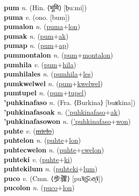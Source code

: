 \textbf{pum} \textit{n.} (Hin. ⟨भूमि⟩ [b̤uːmi])
 \label{pum} \\
\textbf{puma} \textit{v.} (ono. [bum])
 \label{puma} \\
\textbf{pumalon} \textit{n.} (\hyperref[puma]{puma}+\hyperref[lon]{lon})
 \label{pumalon} \\
\textbf{pumak} \textit{n.} (\hyperref[pum]{pum}+\hyperref[ak]{ak})
 \label{pumak} \\
\textbf{pumap} \textit{n.} (\hyperref[pum]{pum}+\hyperref[ap]{ap})
 \label{pumap} \\
\textbf{pummontalon} \textit{n.} (\hyperref[pum]{pum}+\hyperref[montalon]{montalon})
 \label{pummontalon} \\
\textbf{pumhila} \textit{v.} (\hyperref[pum]{pum}+\hyperref[hila]{hila})
 \label{pumhila} \\
\textbf{pumhilales} \textit{n.} (\hyperref[pumhila]{pumhila}+\hyperref[les]{les})
 \label{pumhilales} \\
\textbf{pumkwelwel} \textit{n.} (\hyperref[pum]{pum}+\hyperref[kwelwel]{kwelwel})
 \label{pumkwelwel} \\
\textbf{pumtupel} \textit{n.} (\hyperref[pum]{pum}+\hyperref[tupel]{tupel})
 \label{pumtupel} \\
\textbf{'puhkinafaso} \textit{n.} (Fra. ⟨Burkina⟩ [buʁkina])
 \label{'puhkinafaso} \\
\textbf{'puhkinafasoak} \textit{n.} (\hyperref['puhkinafaso]{'puhkinafaso}+\hyperref[ak]{ak})
 \label{'puhkinafasoak} \\
\textbf{'puhkinafasowon} \textit{n.} (\hyperref['puhkinafaso]{'puhkinafaso}+\hyperref[won]{won})
 \label{'puhkinafasowon} \\
\textbf{puhte} \textit{v.} (\hyperref[miclo]{\sout{miclo}})
 \label{puhte} \\
\textbf{puhtelon} \textit{n.} (\hyperref[puhte]{puhte}+\hyperref[lon]{lon})
 \label{puhtelon} \\
\textbf{puhtecwelon} \textit{n.} (\hyperref[puhte]{puhte}+\hyperref[cwelon]{cwelon})
 \label{puhtecwelon} \\
\textbf{puhteki} \textit{v.} (\hyperref[puhte]{puhte}+\hyperref[ki]{ki})
 \label{puhteki} \\
\textbf{puhtekilum} \textit{n.} (\hyperref[puhteki]{puhteki}+\hyperref[lum]{lum})
 \label{puhtekilum} \\
\textbf{puco} \textit{v.} (Cmn. ⟨步骤⟩ [pu˥˩ʈ͡ʂoʊ̯˥˩])
 \label{puco} \\
\textbf{pucolon} \textit{n.} (\hyperref[puco]{puco}+\hyperref[lon]{lon})
